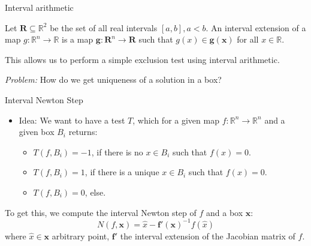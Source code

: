 \documentclass[german,10pt,xcolor=colortbl,compress,handout]{beamer}
\begin{document}
\begin{frame}{Interval arithmetic}
    \begin{definition}
        Let  $\mathbf{R} \subseteq \mathbb{R}^2$ be the set of all real intervals $[a,b],
        a < b$. An interval extension of a map $g: \mathbb{R}^n \to \mathbb{R}$ is a map
        $\mathbf{g}: \mathbf{R}^n \to \mathbf{R}$ such that $g(x) \in
        \mathbf{g}(\mathbf{x}) $ for all $x \in \mathbb{R}$.
    \end{definition}

    This allows us to perform a simple exclusion test using interval arithmetic.
    \bigskip

    \emph{Problem:} How do we get uniqueness of a solution in a box?
\end{frame}

\begin{frame}{Interval Newton Step}
    \begin{itemize}
    \pause
    \item Idea: We want to have a test $T$, which for a given map $f: \mathbb{R}^n \to
        \mathbb{R}^n$ and a given box $B_i$ returns:
        \begin{itemize}
            \item $T(f,B_i)=-1$, if there is no $x \in B_i$ such that $f(x)=0$.
            \item $T(f,B_i)=1$,  if there is a unique $x \in B_i$ such that $f(x)=0$.
            \item $T(f,B_i)=0$, else.
        \end{itemize}
    \end{itemize}
    \pause
    To get this, we compute the interval Newton step of $f$ and a box $\mathbf{x}$: $$
    N(f, \mathbf{x})= \hat{x} - \mathbf{f'}(\mathbf{x})^{-1}f(\hat{x})$$ where $\hat{x}
    \in \mathbf{x}$ arbitrary point, $\mathbf{f'}$ the interval extension of the Jacobian
    matrix of $f$.
\end{frame}
\end{document}
